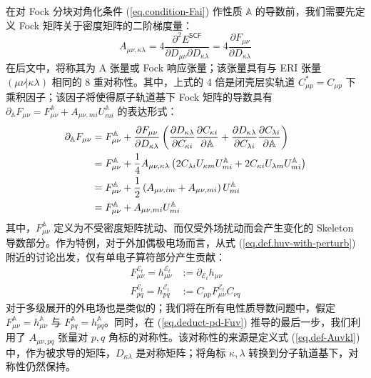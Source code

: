 在对 Fock 分块对角化条件 (\ref{eq.condition-Fai}) 作性质 $\mathbb{A}$ 的导数前，我们需要先定义 Fock 矩阵关于密度矩阵的二阶梯度量：
\begin{equation}
  \label{eq.def-Auvkl}
  A_{\mu \nu, \kappa \lambda} = 4 \frac{\partial^2 E^\textsf{SCF}}{\partial D_{\mu \nu} \partial D_{\kappa \lambda}} = 4 \frac{\partial F_{\mu \nu}}{\partial D_{\kappa \lambda}}
\end{equation}
在后文中，将称其为 A 张量或 Fock 响应张量；该张量具有与 ERI 张量 $(\mu \nu | \kappa \lambda)$ 相同的 8 重对称性。其中，上式的 4 倍是闭壳层实轨道 $C_{\mu p}^* = C_{\mu p}$ 下乘积因子；该因子将使得原子轨道基下 Fock 矩阵的导数具有 $\partial_\mathbb{A} F_{\mu \nu} = F_{\mu \nu}^\mathbb{A} + A_{\mu \nu, mi} U_{mi}^\mathbb{A}$ 的表达形式：
\begin{align}
  \label{eq.deduct-pd-Fuv}
  \partial_\mathbb{A} F_{\mu \nu} &= F_{\mu \nu}^\mathbb{A} + \frac{\partial F_{\mu \nu}}{\partial D_{\kappa \lambda}} \left( \frac{\partial D_{\kappa \lambda}}{\partial C_{\kappa i}} \frac{\partial C_{\kappa i}}{\partial \mathbb{A}} + \frac{\partial D_{\kappa \lambda}}{\partial C_{\lambda i}} \frac{\partial C_{\lambda i}}{\partial \mathbb{A}} \right) \notag\\
  &= F_{\mu \nu}^\mathbb{A} + \frac{1}{4} A_{\mu \nu, \kappa \lambda} \left( 2 C_{\lambda i} U_{\kappa m} U_{mi}^\mathbb{A} + 2 C_{\kappa i} U_{\lambda m} U_{mi}^\mathbb{A} \right) \notag\\
  &= F_{\mu \nu}^\mathbb{A} + \frac{1}{2} \left( A_{\mu \nu, im} + A_{\mu \nu, mi} \right) U_{mi}^\mathbb{A} \notag\\
  &= F_{\mu \nu}^\mathbb{A} + A_{\mu \nu, mi} U_{mi}^\mathbb{A}
\end{align}
其中，$F_{\mu \nu}^\mathbb{A}$ 定义为不受密度矩阵扰动、而仅受外场扰动而会产生变化的 Skeleton 导数部分。作为特例，对于外加偶极电场而言，从式 (\ref{eq.def.huv-with-perturb}) 附近的讨论出发，仅有单电子算符部分产生贡献：
\begin{align}
  \label{eq.def.sleketon-huv}
  F_{\mu \nu}^{\mathcal{E}_t} = h_{\mu \nu}^{\mathcal{E}_t} &:= \partial_{\mathcal{E}_t} h_{\mu \nu} \\
  F_{pq}^{\mathcal{E}_t} = h_{pq}^{\mathcal{E}_t} &:= C_{\mu p} F_{\mu \nu}^{\mathcal{E}_t} C_{\nu q}
\end{align}
对于多级展开的外电场也是类似的；我们将在所有电性质导数问题中，假定 $F_{\mu \nu}^\mathbb{A} = h_{\mu \nu}^\mathbb{A}$ 与 $F_{pq}^\mathbb{A} = h_{pq}^\mathbb{A}$。同时，在 (\ref{eq.deduct-pd-Fuv}) 推导的最后一步，我们利用了 $A_{\mu \nu, pq}$ 张量对 $p, q$ 角标的对称性。该对称性的来源是定义式 (\ref{eq.def-Auvkl}) 中，作为被求导的矩阵，$D_{\kappa \lambda}$ 是对称矩阵；将角标 $\kappa, \lambda$ 转换到分子轨道基下，对称性仍然保持。

